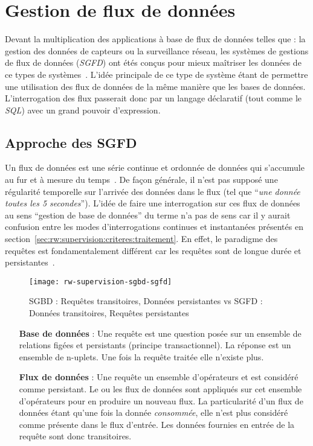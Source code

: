 \section{Gestion de flux de données}
Devant la multiplication des applications à base de flux de données telles que : la gestion des données de capteurs ou la surveillance réseau, les systèmes de gestions de flux de données (\textit{SGFD}) ont étés conçus pour mieux maîtriser les données de ce types de systèmes~\cite{Madden:tag, Yao:cougar, Cranor:gigascope}. L'idée principale de ce type de système étant de permettre une utilisation des flux de données de la même manière que les bases de données. L'interrogation des flux passerait donc par un langage déclaratif (tout comme le \textit{SQL}) avec un grand pouvoir d'expression.
\subsection{Approche des SGFD}
Un flux de données est une série continue et ordonnée de données qui s'accumule au fur et à mesure du temps~\cite{Golab:issues}. De façon générale, il n'est pas supposé une régularité temporelle sur l'arrivée des données dans le flux (tel que \enquote{\it une donnée toutes les 5 secondes}). L'idée de faire une interrogation sur ces flux de données au sens \enquote{gestion de base de données} du terme n'a pas de sens car il y aurait confusion entre les modes d'interrogations continues et instantanées présentés en section~\ref{sec:rw:supervision:criteres:traitement}. En effet, le paradigme des requêtes est fondamentalement différent car les requêtes sont de longue durée et persistantes~\cite{Chen:niagaracq}.
\begin{figure}[ht]
    \centering
    \texttt{[image: rw-supervision-sgbd-sgfd]}
    \caption{SGBD : Requêtes transitoires, Données persistantes vs SGFD : Données transitoires, Requêtes persistantes~\cite{Gurgen:sstreamware}}
\end{figure}

\begin{itemize}
    \item[\textbf{Base de données}] : Une requête est une question posée sur un ensemble de relations figées et persistants (principe transactionnel). La réponse est un ensemble de n-uplets. Une fois la requête traitée elle n'existe plus.
    \item[\textbf{Flux de données}] : Une requête un ensemble d'opérateurs et est considéré comme persistant. Le ou les flux de données sont appliqués sur cet ensemble d'opérateurs pour en produire un nouveau flux. La particularité d'un flux de données étant qu'une fois la donnée \textit{consommée}, elle n'est plus considéré comme présente dans le flux d'entrée. Les données fournies en entrée de la requête sont donc transitoires.
\end{itemize}

